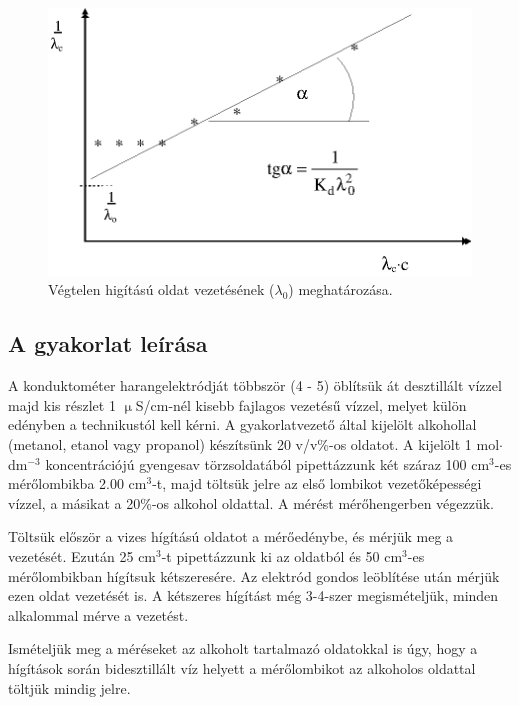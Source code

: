 \begin{figure}
\centering
\includegraphics{fig/lambda0.eps}
\caption{Végtelen higítású oldat vezetésének ($\lambda_0$) meghatározása.}
\label{fig:}
\end{figure}

\subsection{A gyakorlat leírása}

A konduktométer harangelektródját többször (4 - 5) öblítsük át desztillált vízzel majd kis részlet 1 $\upmu$S/cm-nél kisebb fajlagos vezetésű vízzel, melyet külön edényben a technikustól kell kérni.
A gyakorlatvezető által kijelölt alkohollal (metanol, etanol vagy propanol) készítsünk 20 v/v\%-os oldatot.
A kijelölt 1 mol$\cdot$dm$^{-3}$ koncentrációjú gyengesav törzsoldatából pipettázzunk két száraz 100 cm$^3$-es mérőlombikba 2.00 cm$^3$-t, majd töltsük jelre az első lombikot vezetőképességi vízzel, a másikat a 20\%-os alkohol oldattal.
A mérést mérőhengerben végezzük.

Töltsük először a vizes hígítású oldatot a mérőedénybe, és mérjük meg a vezetését.
Ezután 25 cm$^3$-t pipettázzunk ki az oldatból és 50 cm$^3$-es mérőlombikban hígítsuk kétszeresére.
Az elektród gondos leöblítése után mérjük ezen oldat vezetését is.
A kétszeres hígítást még 3-4-szer megismételjük, minden alkalommal mérve a vezetést.

Ismételjük meg a méréseket az alkoholt tartalmazó oldatokkal is úgy, hogy a hígítások során bidesztillált víz helyett a mérőlombikot az alkoholos oldattal töltjük mindig jelre.

